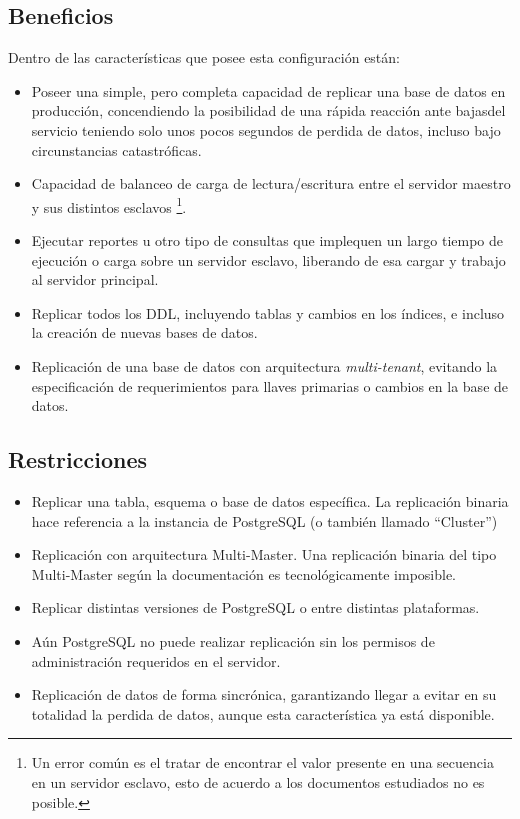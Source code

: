 \documentclass[11pt]{article}
\begin{document}
\subsection{Beneficios}
Dentro de las caracter\'isticas que posee esta configuraci\'on est\'an:
\begin{itemize}
\item Poseer una simple, pero completa capacidad de replicar una base de datos en producci\'on, concendiendo la posibilidad de una r\'apida reacci\'on ante bajasdel servicio teniendo solo unos pocos segundos de perdida de datos, incluso bajo circunstancias catastr\'oficas.
\item Capacidad de balanceo de carga de lectura/escritura  entre el servidor maestro y sus distintos esclavos \footnote{Un error com\'un es el tratar de encontrar el valor presente en una secuencia en un servidor esclavo, esto de acuerdo a los documentos estudiados no es posible.}.
\item Ejecutar reportes u otro tipo de consultas que implequen un largo tiempo de ejecuci\'on o carga sobre un servidor esclavo, liberando de esa cargar y trabajo al servidor principal.
\item  Replicar todos los DDL, incluyendo tablas y cambios en los \'indices, e incluso la creaci\'on de nuevas bases de datos.
\item Replicaci\'on de una base de datos con arquitectura \textit{multi-tenant}, evitando la especificaci\'on de requerimientos para llaves primarias o cambios en la base de datos.
\end{itemize}

\subsection{Restricciones}
\begin{itemize}
\item Replicar una tabla, esquema o base de datos espec\'ifica. La replicaci\'on binaria hace referencia a la instancia de PostgreSQL (o tambi\'en llamado ``Cluster'')
\item Replicaci\'on con arquitectura Multi-Master. Una replicaci\'on binaria del tipo Multi-Master seg\'un la documentaci\'on es tecnol\'ogicamente imposible.
\item Replicar distintas versiones de PostgreSQL o entre distintas plataformas.
\item A\'un PostgreSQL no puede realizar replicaci\'on sin los permisos de administraci\'on requeridos en el servidor.
\item Replicaci\'on de datos de forma sincr\'onica, garantizando llegar a evitar en su totalidad la perdida de datos, aunque esta caracter\'istica ya est\'a disponible.
\end{itemize}
\end{document}
